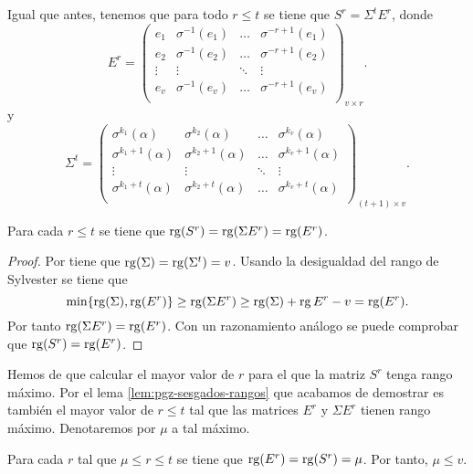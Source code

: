 Igual que antes, tenemos que para todo \(r \leq t\) se tiene que \(S^r = \Sigma^tE^r\), donde 
\[
  E^r = \begin{pmatrix}
    e_1 & \sigma^{-1}(e_1) & \dots & \sigma^{-r + 1}(e_1)\\
    e_2 & \sigma^{-1}(e_2) & \dots & \sigma^{-r + 1}(e_2)\\
    \vdots & \vdots & \ddots & \vdots \\
    e_v & \sigma^{-1}(e_v) & \dots & \sigma^{-r + 1}(e_v)\\
  \end{pmatrix}_{v \times r}.
\]
y
\[
  \Sigma^t = \begin{pmatrix}
    \sigma^{k_1}(\alpha) & \sigma^{k_2}(\alpha) & \dots & \sigma^{k_v}(\alpha)\\
    \sigma^{k_1 + 1}(\alpha) & \sigma^{k_2 + 1}(\alpha) & \dots & \sigma^{k_v + 1}(\alpha)\\
    \vdots & \vdots & \ddots & \vdots \\
    \sigma^{k_1 + t}(\alpha) & \sigma^{k_2 + t}(\alpha) & \dots & \sigma^{k_v + t}(\alpha)\\
  \end{pmatrix}_{(t+1)\times v}.
\]

\begin{lemma}
  \label{lem:pgz-sesgados-rangos}
  Para cada \(r \leq t\) se tiene que \(\operatorname{rg}(S^r) = \operatorname{rg}(\Sigma E^r) = \operatorname{rg}(E^r)\).
\end{lemma}

\begin{proof}
  Por \parencite[Lema 2.1]{gomez-torrecillas_petersongorensteinzierler_2018} tiene que \(\operatorname{rg}(\Sigma) = \operatorname{rg}(\Sigma^t) = v\).
  Usando la desigualdad del rango de Sylvester se tiene que
  \[
    \min\{\operatorname{rg}(\Sigma), \operatorname{rg}(E^r)\} \geq \operatorname{rg}(\Sigma E^r) \geq \operatorname{rg}(\Sigma) + \operatorname{rg} E^r - v = \operatorname{rg}(E^r).
  \]
  Por tanto \(\operatorname{rg}(\Sigma E^r) = \operatorname{rg}(E^r)\).
  Con un razonamiento análogo se puede comprobar que \(\operatorname{rg}(S^r) = \operatorname{rg}(E^r)\).
\end{proof}

Hemos de que calcular el mayor valor de \(r\) para el que la matriz \(S^r\) tenga rango máximo.
Por el lema \ref{lem:pgz-sesgados-rangos} que acabamos de demostrar es también el mayor valor de \(r \leq t\) tal que las matrices \(E^r\) y \(\Sigma E^r\) tienen rango máximo.
Denotaremos por \(\mu\) a tal máximo.

\begin{lemma}
  \label{lem:pgz-sesgados-rango-mu}
  Para cada \(r\) tal que \(\mu \leq r \leq t\) se tiene que \(\operatorname{rg}(E^r) = \operatorname{rg}(S^r) = \mu\).
  Por tanto, \(\mu \leq v\).
\end{lemma}

